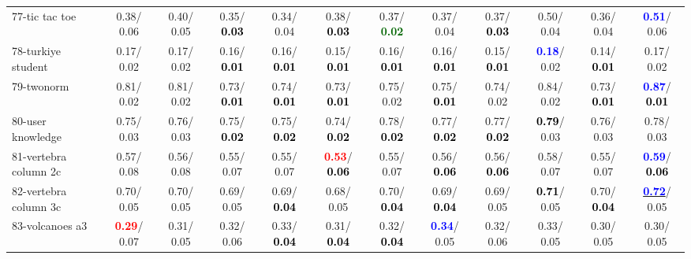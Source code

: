 \begin{table}[h]
\begin{center}
{\begin{tabular}{lc|c|c|c|c|c|c|c|c|c|c}
77-tic tac toe &   0.38/  0.06 &   0.40/  0.05 &   0.35/\textcolor{black}{\textbf{  0.03}} &   0.34/  0.04 &   0.38/\textcolor{black}{\textbf{  0.03}} &   0.37/\textcolor{darkgreen}{\textbf{  0.02}} &   0.37/  0.04 &   0.37/\textcolor{black}{\textbf{  0.03}} &   0.50/  0.04 &   0.36/  0.04 & \textcolor{blue}{\textbf{  0.51}}/  0.06 \\
78-turkiye student &   0.17/  0.02 &   0.17/  0.02 &   0.16/\textcolor{black}{\textbf{  0.01}} &   0.16/\textcolor{black}{\textbf{  0.01}} &   0.15/\textcolor{black}{\textbf{  0.01}} &   0.16/\textcolor{black}{\textbf{  0.01}} &   0.16/\textcolor{black}{\textbf{  0.01}} &   0.15/\textcolor{black}{\textbf{  0.01}} & \textcolor{blue}{\textbf{  0.18}}/  0.02 &   0.14/\textcolor{black}{\textbf{  0.01}} &   0.17/  0.02 \\ \hline
79-twonorm &   0.81/  0.02 &   0.81/  0.02 &   0.73/\textcolor{black}{\textbf{  0.01}} &   0.74/\textcolor{black}{\textbf{  0.01}} &   0.73/\textcolor{black}{\textbf{  0.01}} &   0.75/  0.02 &   0.75/\textcolor{black}{\textbf{  0.01}} &   0.74/  0.02 &   0.84/  0.02 &   0.73/\textcolor{black}{\textbf{  0.01}} & \textcolor{blue}{\textbf{  0.87}}/\textcolor{black}{\textbf{  0.01}} \\
80-user knowledge &   0.75/  0.03 &   0.76/  0.03 &   0.75/\textcolor{black}{\textbf{  0.02}} &   0.75/\textcolor{black}{\textbf{  0.02}} &   0.74/\textcolor{black}{\textbf{  0.02}} &   0.78/\textcolor{black}{\textbf{  0.02}} &   0.77/\textcolor{black}{\textbf{  0.02}} &   0.77/\textcolor{black}{\textbf{  0.02}} & \textcolor{black}{\textbf{  0.79}}/  0.03 &   0.76/  0.03 &   0.78/  0.03 \\
81-vertebra column 2c &   0.57/  0.08 &   0.56/  0.08 &   0.55/  0.07 &   0.55/  0.07 & \textcolor{red}{\textbf{  0.53}}/\textcolor{black}{\textbf{  0.06}} &   0.55/  0.07 &   0.56/\textcolor{black}{\textbf{  0.06}} &   0.56/\textcolor{black}{\textbf{  0.06}} &   0.58/  0.07 &   0.55/  0.07 & \textcolor{blue}{\textbf{  0.59}}/\textcolor{black}{\textbf{  0.06}} \\
82-vertebra column 3c &   0.70/  0.05 &   0.70/  0.05 &   0.69/  0.05 &   0.69/\textcolor{black}{\textbf{  0.04}} &   0.68/  0.05 &   0.70/\textcolor{black}{\textbf{  0.04}} &   0.69/\textcolor{black}{\textbf{  0.04}} &   0.69/  0.05 & \textcolor{black}{\textbf{  0.71}}/  0.05 &   0.70/\textcolor{black}{\textbf{  0.04}} & \underline{\textcolor{blue}{\textbf{  0.72}}}/  0.05 \\
83-volcanoes a3 & \textcolor{red}{\textbf{  0.29}}/  0.07 &   0.31/  0.05 &   0.32/  0.06 &   0.33/\textcolor{black}{\textbf{  0.04}} &   0.31/\textcolor{black}{\textbf{  0.04}} &   0.32/\textcolor{black}{\textbf{  0.04}} & \textcolor{blue}{\textbf{  0.34}}/  0.05 &   0.32/  0.06 &   0.33/  0.05 &   0.30/  0.05 &   0.30/  0.05 \\

\end{tabular}}
\end{center}
\end{table}
